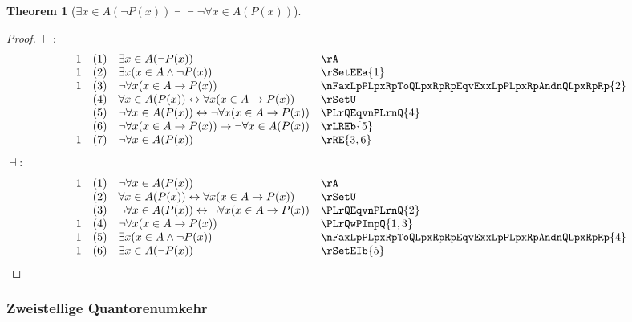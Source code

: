 \documentclass{book}
\theoremstyle{plain}
\newtheorem{theorem}{Theorem}
\theoremstyle{remark}
\theoremstyle{definition}
\begin{document}
\label{ExxInALpnPLpxRpRpEqvnFaxInALpPLpxRpRp}
\begin{theorem}[\(\exists x \in A(\neg P(x)) \dashv\vdash \neg\forall x \in A(P(x))\)]
\end{theorem}
\begin{proof}
	\(\vdash:\)
	\[
	\begin{array}{llll}
		1 & (1) & \exists x \in A(\neg P(x)) & \rA \\
		1 & (2) & \exists x (x \in A \wedge \neg P(x)) & \rSetEEa{1} \\
		1 & (3) & \neg\forall x(x \in A \rightarrow P(x)) & \nFaxLpPLpxRpToQLpxRpRpEqvExxLpPLpxRpAndnQLpxRpRp{2} \\
		& (4) & \forall x \in A(P(x)) \leftrightarrow \forall x(x \in A \rightarrow P(x)) & \rSetU \\
		& (5) & \neg \forall x \in A(P(x)) \leftrightarrow \neg\forall x(x \in A \rightarrow P(x)) & \PLrQEqvnPLrnQ{4} \\
		& (6) & \neg \forall x(x \in A \rightarrow P(x))\rightarrow \neg \forall x \in A(P(x)) & \rLREb{5} \\
		1 & (7) & \neg \forall x \in A(P(x)) & \rRE{3,6} \\
	\end{array}
	\]
	\(\dashv:\)
	\[
	\begin{array}{llll}
		1 & (1) & \neg \forall x \in A(P(x)) & \rA \\
		& (2) & \forall x \in A(P(x)) \leftrightarrow \forall x(x \in A \rightarrow P(x)) & \rSetU \\
		& (3) & \neg \forall x \in A(P(x)) \leftrightarrow \neg\forall x(x \in A \rightarrow P(x)) & \PLrQEqvnPLrnQ{2} \\
		1 & (4) & \neg\forall x(x \in A \rightarrow P(x)) & \PLrQwPImpQ{1,3} \\
		1 & (5) & \exists x(x \in A \wedge \neg P(x)) & \nFaxLpPLpxRpToQLpxRpRpEqvExxLpPLpxRpAndnQLpxRpRp{4} \\
		1 & (6) & \exists x \in A(\neg P(x)) & \rSetEIb{5} \\
	\end{array}
	\]
\end{proof}

\subsubsection{Zweistellige Quantorenumkehr}
\end{document}
